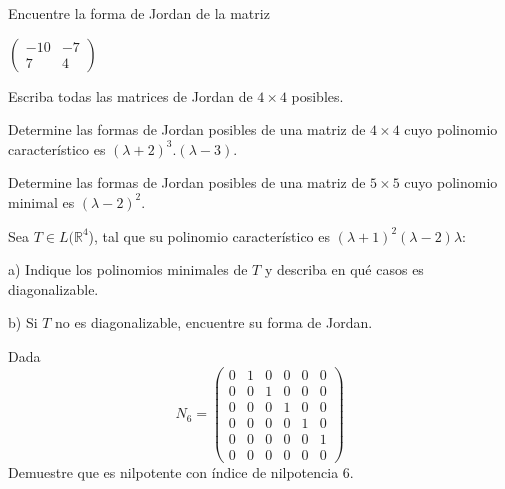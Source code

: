 \begin{exercise} 

\item
Encuentre la forma de Jordan de la matriz

\bigskip
 
$ \left(\begin{array}{cc}-10 & -7 \\7 & 4
\end{array}
 \right)$

\end{exercise} 
\begin{exercise} 

\item

Escriba todas las  matrices de Jordan de $ 4 \times 4$ posibles.

\end{exercise} 
\begin{exercise} 
\item

Determine las formas de Jordan posibles de una matriz de $ 4 \times 4$  cuyo polinomio característico es 
$ (\lambda +2)^3.(\lambda -3)$.

\end{exercise} 
\begin{exercise} 
\item

Determine las formas de Jordan posibles de una matriz de $ 5 \times 5$  cuyo polinomio minimal es 
$ (\lambda -2)^2$.
\end{exercise} 
\begin{exercise} 

\item

Sea $T \in L(\mathbb{R}^4$), tal que su polinomio característico es $(\lambda+1)^2(\lambda-2) \lambda$:

\bigskip

a) Indique los polinomios minimales de $T$ y describa en qué casos es diagonalizable.

\bigskip

b) Si $T$ no es diagonalizable, encuentre su forma de Jordan.

\end{exercise} 


\bigskip


\begin{exercise} 
\item
Dada \[N_6=\left(\begin{array}{cccccc}0 & 1 & 0 &0 &0 &0  \\ 0& 0 & 1 & 0 &0
& 0\\ 0  & 0 & 0 &1 & 0 & 0\\0 & 0 & 0 & 0 &1 &0 \\0 & 0 & 0 & 0 &0 &1\\0 & 0 & 0 & 0 & 0 & 0                        
\end{array}
 \right)
\]
Demuestre que es nilpotente con índice de nilpotencia $6$.

\end{exercise} 

